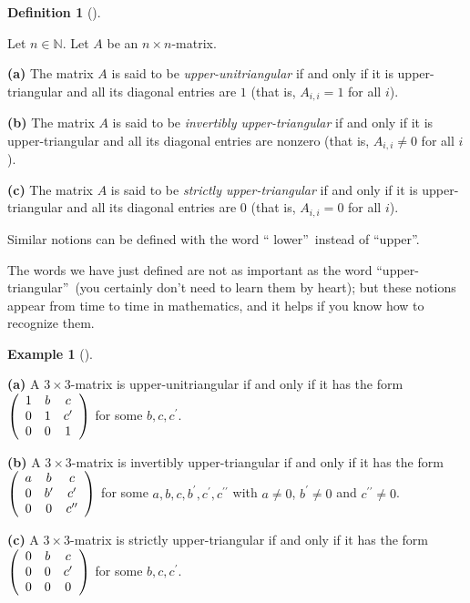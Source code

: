 \documentclass[numbers=enddot,12pt,final,onecolumn,notitlepage]{scrartcl}%
\theoremstyle{definition}
\newtheorem{defi}[theo]{Definition}
\newenvironment{definition}[1][]
{\begin{defi}[#1]\begin{leftbar}}
{\end{leftbar}\end{defi}}
\newtheorem{exam}[theo]{Example}
\newenvironment{example}[1][]
{\begin{exam}[#1]\begin{leftbar}}
{\end{leftbar}\end{exam}}
\begin{document}
\begin{definition}
\label{def.triangular.uni-up}Let $n\in\mathbb{N}$. Let $A$ be an $n\times n$-matrix.

\textbf{(a)} The matrix $A$ is said to be \textit{upper-unitriangular} if and
only if it is upper-triangular and all its diagonal entries are $1$ (that is,
$A_{i,i}=1$ for all $i$).

\textbf{(b)} The matrix $A$ is said to be \textit{invertibly upper-triangular}
if and only if it is upper-triangular and all its diagonal entries are nonzero
(that is, $A_{i,i}\neq0$ for all $i$).

\textbf{(c)} The matrix $A$ is said to be \textit{strictly upper-triangular}
if and only if it is upper-triangular and all its diagonal entries are $0$
(that is, $A_{i,i}=0$ for all $i$).

Similar notions can be defined with the word \textquotedblleft
lower\textquotedblright\ instead of \textquotedblleft upper\textquotedblright.
\end{definition}

The words we have just defined are not as important as the word
\textquotedblleft upper-triangular\textquotedblright\ (you certainly don't
need to learn them by heart); but these notions appear from time to time in
mathematics, and it helps if you know how to recognize them.

\begin{example}
\textbf{(a)} A $3\times3$-matrix is upper-unitriangular if and only if it has
the form $\left(
\begin{array}
[c]{ccc}%
1 & b & c\\
0 & 1 & c^{\prime}\\
0 & 0 & 1
\end{array}
\right)  $ for some $b,c,c^{\prime}$.

\textbf{(b)} A $3\times3$-matrix is invertibly upper-triangular if and only if
it has the form $\left(
\begin{array}
[c]{ccc}%
a & b & c\\
0 & b^{\prime} & c^{\prime}\\
0 & 0 & c^{\prime\prime}%
\end{array}
\right)  $ for some $a,b,c,b^{\prime},c^{\prime},c^{\prime\prime}$ with
$a\neq0$, $b^{\prime}\neq0$ and $c^{\prime\prime}\neq0$.

\textbf{(c)} A $3\times3$-matrix is strictly upper-triangular if and only if
it has the form $\left(
\begin{array}
[c]{ccc}%
0 & b & c\\
0 & 0 & c^{\prime}\\
0 & 0 & 0
\end{array}
\right)  $ for some $b,c,c^{\prime}$.
\end{example}
\end{document}
